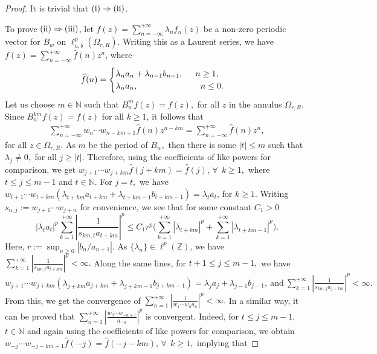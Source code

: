 \documentclass[12pt, reqno]{amsart}
\theoremstyle{definition}
\theoremstyle{remark}
\numberwithin{equation}{section}
\begin{document}
    \begin{proof}
It is trivial that $\textnormal{(i)} \Rightarrow \textnormal{(ii)} $.
   
To prove $\textnormal{(ii)} \Rightarrow \textnormal{(iii)}$, let $f(z)=\sum_{n=-\infty}^{+\infty}\lambda_{n}f_{n}(z)$ be a non-zero periodic vector for $B_{w}$ on  $\ell^{p}_{a,b}(\Omega_{r,R}).$ Writing this as a Laurent series, we have $f(z)=\sum_{n=-\infty}^{+\infty} \widehat{f}(n)z^{n}$, where 
 $$\widehat{f}(n)=
\begin{cases}
   \lambda_{n}a_n+\lambda_{n-1}b_{n-1}, \hskip.5cm n\geq 1,\\ \lambda_{n}a_n,\hskip 2.6cm n\leq 0.
\end{cases}$$
 Let us choose $m \in \mathbb{N}$ such that $B_{w}^{m}f(z)=f(z),$ for all $z$ in the annulus $\Omega_{r,R}$. Since $B_{w}^{km}f(z)=f(z)$ for all $k\geq 1$, it follows that 
 \begin{eqnarray*}
\sum_{n=-\infty}^{+\infty} w_{n}\cdots w_{n-km+1}\widehat{f}(n)z^{n-km}=\sum_{n=-\infty}^{+\infty} \widehat{f}(n)z^{n},
\end{eqnarray*}
for all $z\in \Omega_{r,R}$. As $m$ be the period of $B_{w},$ then there is some $\lvert t\rvert\leq m$ such that $\lambda_{j}\neq 0,$ for all $j\geq \lvert t\rvert.$  Therefore, using the coefficients of like powers for comparison, we get
  $w_{j+1}\cdots w_{j+km}\widehat{f}(j+km)=\widehat{f}(j)$, $\forall~~ k \geq 1,$  
where $t\leq j \leq m-1$ and $t\in\mathbb{N}$. For $j=t,$ we have $w_{t+1}\cdots w_{t+km}(\lambda_{t+km}a_{t+km}+\lambda_{t+km-1}b_{t+km-1})=\lambda_{t}a_{t}$, for $ k \geq 1.$ Writing $s_{n,j}:=w_{j+1}\cdots w_{j+n}$ for convenience, we see that for some constant $C_1>0$
\[
\lvert\lambda_{t}a_{t}\rvert^{p}\sum_{k=1}^{+\infty}\left\lvert\frac{1}{s_{km,t}a_{t+km}}\right\rvert^{p}\leq C_{1}r^{p}\big(\sum_{k=1}^{+\infty}\left\lvert\lambda_{t+km}\right\rvert^{p}+\sum_{k=1}^{+\infty}\left\lvert\lambda_{t+km-1}\right\rvert^{p}\big).
\]
 Here, $r:=\sup_{n\geq 0}\left\lvert b_{n}/a_{n+1}\right\rvert$. As $\{\lambda_{n}\} \in \ell^{p}(\mathbb{Z})$, we have 
$\sum_{k=1}^{+\infty}\left\lvert\frac{1}{s_{km,t}a_{t+km}}\right\rvert^{p}<\infty.$ Along the same lines, for $t+1\leq j\leq m-1,$ we have
$
w_{j+1}\cdots w_{j+km}(\lambda_{j+km}a_{j+km}+\lambda_{j+km-1}b_{j+km-1})=\lambda_{j}a_{j}+\lambda_{j-1}b_{j-1},~\text{and}~\sum_{k=1}^{+\infty}\left\lvert\frac{1}{s_{km,j}a_{j+km}}\right\rvert^{p}<\infty.
$
From this, we get the convergence of 
$\sum_{n=1}^{+\infty} \left\lvert\frac{1}{w_{1}\cdots w_{n}a_{n}}\right\rvert^{p}<\infty.$ In a similar way, it can be proved that $\sum_{n=1}^{+\infty}\left\lvert  \frac{w_{0}\cdots w_{-n+1}}{a_{-n}}\right\rvert^{p} $ is convergent. Indeed, for $t\leq j \leq m-1,$ $t\in\mathbb{N}$ and again using the coefficients of like powers for comparison, we obtain $w_{-j}\cdots w_{-j-km+1}\widehat{f}(-j)=\widehat{f}(-j-km)$, $\forall~~ k \geq 1,$ implying that 

\end{proof}
\end{document}
